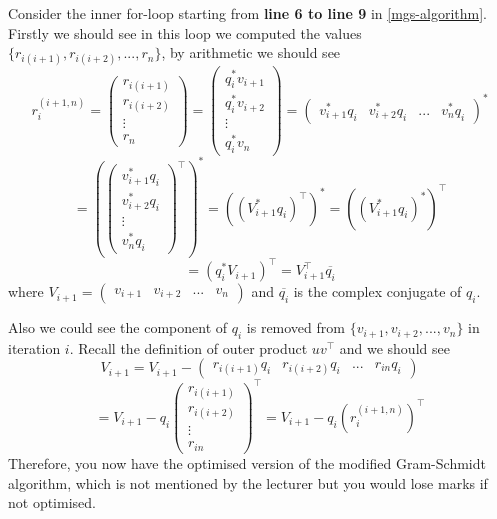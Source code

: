 \newpage
\noindent Consider the inner for-loop starting from \textbf{line 6 to line 9} in \autoref{mgs-algorithm}. Firstly we should see in this loop we computed the values \(\{r_{i(i + 1)}, r_{i(i + 2)}, ..., r_n\}\), by arithmetic we should see
\[
  r_i^{(i + 1, n)} = \begin{pmatrix} 
    r_{i(i + 1)} \\ r_{i(i + 2)} \\ \vdots \\ r_n
  \end{pmatrix}
  = 
  \begin{pmatrix} 
      q_i^{*}v_{i + 1} \\
      q_i^{*}v_{i + 2} \\
      \vdots \\
      q_i^{*}v_{n}
  \end{pmatrix}
  = \begin{pmatrix} 
     v_{i + 1}^{*}q_i & v_{i + 2}^{*}q_i & ... & v_{n}^{*}q_i
  \end{pmatrix}^{*}
\]
\[
  =
  (\begin{pmatrix} 
    v_{i + 1}^{*}q_i \\
    v_{i + 2}^{*}q_i \\
    \vdots \\
    v_{n}^{*}q_i
\end{pmatrix}^{\top})^{*}
  = ((V_{i + 1}^{*}q_i)^{\top})^{*} = ((V_{i + 1}^{*}q_i)^{*})^{\top} 
\]
\[
  = (q_i^{*}V_{i + 1})^{\top} = V_{i + 1}^{\top}\overline{q_i}
\]
where \(V_{i + 1} = \begin{pmatrix} 
    v_{i + 1} & v_{i + 2} & ... & v_{n}
\end{pmatrix} \)  and \(\overline{q_i}\) is the complex conjugate of \(q_i\). \medskip

\noindent Also we could see the component of \(q_i\)  is removed from \(\{v_{i + 1}, v_{i + 2}, ..., v_{n}\} \) in iteration \(i\). Recall the definition of outer product \(uv^{\top}\) and we should see
\[
  V_{i + 1} = V_{i + 1}
  - \begin{pmatrix} 
    r_{i(i + 1)}q_i & r_{i(i + 2)}q_i & ... & r_{in}q_i 
  \end{pmatrix} 
\]
\[
  = V_{i + 1} - q_i \begin{pmatrix} 
    r_{i(i + 1)} \\
    r_{i(i + 2)} \\
    \vdots \\
    r_{in}
  \end{pmatrix}^{\top}
  = V_{i + 1} - q_i (r_i^{(i + 1, n)})^{\top}
\]
Therefore, you now have the optimised version of the modified Gram-Schmidt algorithm, which is not mentioned by the lecturer but you would lose marks if not optimised.

